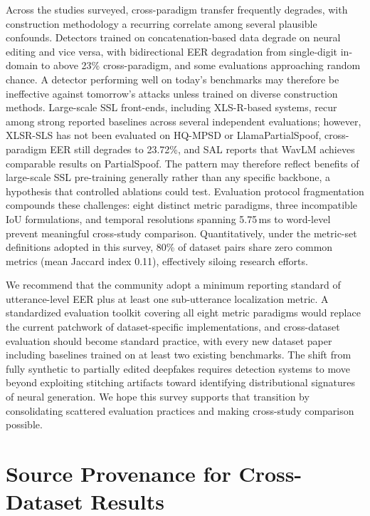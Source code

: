 \documentclass[journal]{IEEEtran}
\begin{document}
Across the studies surveyed, cross-paradigm transfer frequently degrades, with construction methodology a recurring correlate among several plausible confounds. Detectors trained on concatenation-based data degrade on neural editing and vice versa, with bidirectional EER degradation from single-digit in-domain to above 23\% cross-paradigm, and some evaluations approaching random chance. A detector performing well on today's benchmarks may therefore be ineffective against tomorrow's attacks unless trained on diverse construction methods. Large-scale SSL front-ends, including XLS-R-based systems, recur among strong reported baselines across several independent evaluations; however, XLSR-SLS has not been evaluated on HQ-MPSD or LlamaPartialSpoof, cross-paradigm EER still degrades to 23.72\%, and SAL reports that WavLM achieves comparable results on PartialSpoof. The pattern may therefore reflect benefits of large-scale SSL pre-training generally rather than any specific backbone, a hypothesis that controlled ablations could test. Evaluation protocol fragmentation compounds these challenges: eight distinct metric paradigms, three incompatible IoU formulations, and temporal resolutions spanning 5.75\,ms to word-level prevent meaningful cross-study comparison. Quantitatively, under the metric-set definitions adopted in this survey, 80\% of dataset pairs share zero common metrics (mean Jaccard index 0.11), effectively siloing research efforts.

We recommend that the community adopt a minimum reporting standard of utterance-level EER plus at least one sub-utterance localization metric. A standardized evaluation toolkit covering all eight metric paradigms would replace the current patchwork of dataset-specific implementations, and cross-dataset evaluation should become standard practice, with every new dataset paper including baselines trained on at least two existing benchmarks. The shift from fully synthetic to partially edited deepfakes requires detection systems to move beyond exploiting stitching artifacts toward identifying distributional signatures of neural generation. We hope this survey supports that transition by consolidating scattered evaluation practices and making cross-study comparison possible.


\appendices

\section{Source Provenance for Cross-Dataset Results}
\label{app:provenance}
\end{document}
